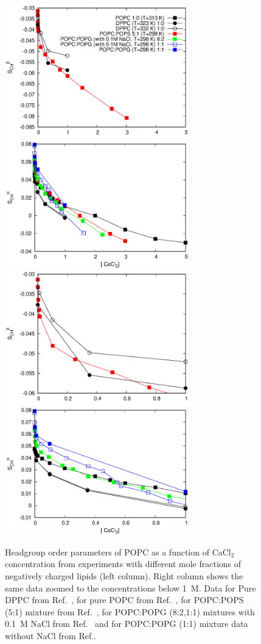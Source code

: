 \documentclass[journal=jpcbfk,manuscript=article]{achemso}
\begin{document}
\begin{figure}[]
  \centering
  \includegraphics[width=8.0cm]{../Figs/LIPIDSwithCaCl.eps}
  \includegraphics[width=8.0cm]{../Figs/LIPIDSwithCaClBELOW1M.eps}
  \caption{\label{OrderParametersWithCaCl}
    Headgroup order parameters of POPC as a function of CaCl$_2$ concentration from experiments 
    with different mole fractions of negatively charged lipids (left column).
    Right column shows the same data zoomed to the concentrations below 1~M.
    Data for Pure DPPC from Ref.~,
    for pure POPC from Ref.~, 
    for POPC:POPS (5:1) mixture from Ref.~,
    for POPC:POPG (8:2,1:1) mixtures with 0.1~M NaCl from Ref.~
    and for POPC:POPG (1:1) mixture data without NaCl from Ref..
  }
\end{figure}
\end{document}
